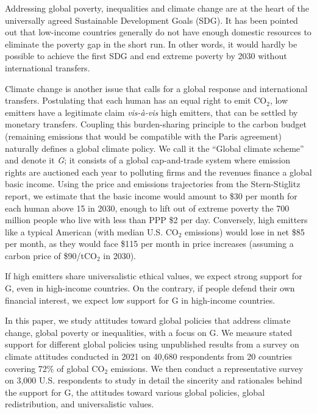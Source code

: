 \documentclass{nature}
\begin{document}
Addressing global poverty, inequalities and climate change are at the heart of the universally agreed Sustainable Development Goals (SDG). %
It has been pointed out that low-income countries generally do not have enough domestic resources to eliminate the poverty gap in the short run.\cite{bolch_arithmetics_2022} In other words, it would hardly be possible to achieve the first SDG and end extreme poverty by 2030 without international transfers. 

Climate change is another issue that calls for a global response and international transfers. Postulating %
that each human has an equal right to emit CO$_\text{2}$, low emitters have a legitimate claim \textit{vis-à-vis} high emitters, that can be settled by monetary transfers. Coupling this burden-sharing principle to the carbon budget (remaining emissions that would be compatible with the Paris agreement) naturally defines a global climate policy. We call it the ``Global climate scheme'' and denote it \textit{G}; it consists of a global cap-and-trade system where emission rights are auctioned each year to polluting firms and the revenues finance a global basic income. Using the price and emissions trajectories from the Stern-Stiglitz report,\cite{stern_report_2017} we estimate that the basic income would amount to \$30 per month for each human above 15 in 2030, enough to lift out of extreme poverty the 700 million people who live with less than PPP \$2 per day. Conversely, high emitters like a typical American (with median U.S. CO$_\text{2}$ emissions) would lose in net \$85 per month, as they would face \$115 per month in price increases (assuming a carbon price of \$90/tCO$_\text{2}$ in 2030).

If high emitters share universalistic ethical values, we expect strong support for G, even in high-income countries. On the contrary, if people defend their own financial interest, we expect low support for G in high-income countries. 

In this paper, we study attitudes toward global policies that address climate change, global poverty or inequalities, with a focus on G. We measure stated support for different global policies using unpublished results from a survey\cite{dechezlepretre_fighting_2022} on climate attitudes conducted in 2021 on 40,680 respondents from 20 countries covering 72\% of global CO$_\text{2}$ emissions. We then conduct a representative survey on 3,000 U.S. respondents to study in detail the sincerity and rationales behind the support for G, the attitudes toward various global policies, global redistribution, and universalistic values.
\end{document}

